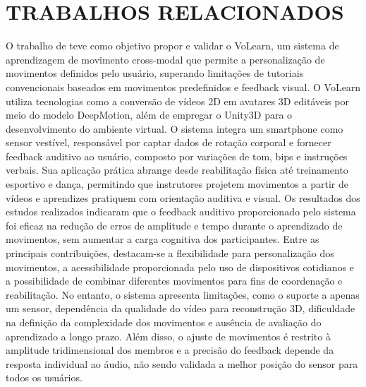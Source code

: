 
\chapter{TRABALHOS RELACIONADOS}
\label{cap:correlatos}

O trabalho de  teve como objetivo propor e validar o VoLearn, um sistema de aprendizagem de movimento cross-modal que permite a personalização de movimentos definidos pelo usuário, superando limitações de tutoriais convencionais baseados em movimentos predefinidos e feedback visual. O VoLearn utiliza tecnologias como a conversão de vídeos 2D em avatares 3D editáveis por meio do modelo DeepMotion, além de empregar o Unity3D para o desenvolvimento do ambiente virtual. O sistema integra um smartphone como sensor vestível, responsável por captar dados de rotação corporal e fornecer feedback auditivo ao usuário, composto por variações de tom, bips e instruções verbais. Sua aplicação prática abrange desde reabilitação física até treinamento esportivo e dança, permitindo que instrutores projetem movimentos a partir de vídeos e aprendizes pratiquem com orientação auditiva e visual. Os resultados dos estudos realizados indicaram que o feedback auditivo proporcionado pelo sistema foi eficaz na redução de erros de amplitude e tempo durante o aprendizado de movimentos, sem aumentar a carga cognitiva dos participantes. Entre as principais contribuições, destacam-se a flexibilidade para personalização dos movimentos, a acessibilidade proporcionada pelo uso de dispositivos cotidianos e a possibilidade de combinar diferentes movimentos para fins de coordenação e reabilitação. No entanto, o sistema apresenta limitações, como o suporte a apenas um sensor, dependência da qualidade do vídeo para reconstrução 3D, dificuldade na definição da complexidade dos movimentos e ausência de avaliação do aprendizado a longo prazo. Além disso, o ajuste de movimentos é restrito à amplitude tridimensional dos membros e a precisão do feedback depende da resposta individual ao áudio, não sendo validada a melhor posição do sensor para todos os usuários.

